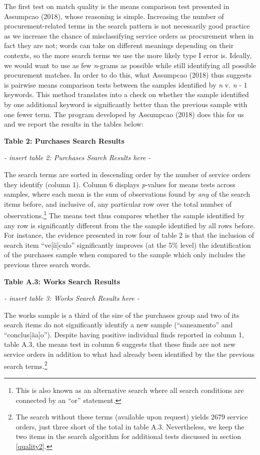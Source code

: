 \documentclass[]{article}
\let\rmarkdownfootnote\footnote%
\def\footnote{\protect\rmarkdownfootnote}
\theoremstyle{definition}
\theoremstyle{definition}
\theoremstyle{definition}
\theoremstyle{remark}
\begin{document}
The first test on match quality is the means comparison test presented
in Assumpcao (2018), whose reasoning is simple. Increasing the number of
procurement-related terms in the search pattern is not necessarily good
practice as we increase the chance of misclassifying service orders as
procurement when in fact they are not; words can take on different
meanings depending on their contexts, so the more search terms we use
the more likely type I error is. Ideally, we would want to use as few
\emph{n}-grams as possible while still identifying all possible
procurement matches. In order to do this, what Assumpcao (2018) thus
suggests is pairwise means comparison tests between the samples
identified by \emph{n} v. \emph{n} - 1 keywords. This method translates
into a check on whether the sample identified by one additional keyword
is significantly better than the previous sample with one fewer term.
The program developed by Assumpcao (2018) does this for us and we report
the results in the tables below:

\textbf{Table 2: Purchases Search Results}

\emph{- insert table 2: Purchases Search Results here -}

The search terms are sorted in descending order by the number of service
orders they identify (column 1). Column 6 displays \emph{p}-values for
means tests across samples, where each mean is the sum of observations
found by \emph{any} of the search items before, and inclusive of, any
particular row over the total number of observations.\footnote{This is
  also known as an alternative search where all search conditions are
  connected by an ``or'' statement.} The means test thus compares
whether the sample identified by any row is significantly different from
the the sample identified by all rows before. For instance, the evidence
presented in row four of table 2 is that the inclusion of search item
``ve{[}íi{]}culo'' significantly improves (at the 5\% level) the
identification of the purchases sample when compared to the sample which
only includes the previous three search words.

\textbf{Table A.3: Works Search Results}

\emph{- insert table 3: Works Search Results here -}

The works sample is a third of the size of the purchases group and two
of its search items do not significantly identify a new sample
(``saneamento'' and ``conclus{[}ãa{]}o''). Despite having positive
individual finds reported in column 1, table A.3, the means test in
column 6 suggests that these finds are not new service orders in
addition to what had already been identified by the the previous search
terms.\footnote{The search without these terms (available upon request)
  yields 2679 service orders, just three short of the total in table
  A.3. Nevertheless, we keep the two items in the search algorithm for
  additional tests discussed in section \ref{quality2}.}
\end{document}
